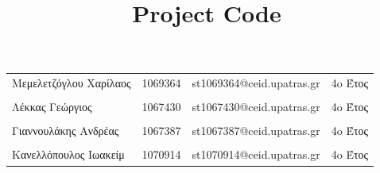 \documentclass{../ol-softwaremanual}
\begin{document}
	
	
	\begin{titlepage}
		
		
		\title{\en Project Code \\}
	\end{titlepage}
	
	
	\maketitle
	
	\newpage
	
	
	\vspace{20pt}
	
	
	
	\begin{table}[htbp!]
		
		\begin{tabular}{llll}
			Μεμελετζόγλου Χαρίλαος & 1069364 & \en st1069364@ceid.upatras.gr & 4o Έτος   \\ 
			\\ Λέκκας Γεώργιος      &      1067430    &   \en st1067430@ceid.upatras.gr & 4o Έτος  \\
			\\ Γιαννουλάκης Ανδρέας        &   1067387       & \en st1067387@ceid.upatras.gr & 4o Έτος           \\
			\\ Κανελλόπουλος Ιωακείμ        &  1070914        &    \en st1070914@ceid.upatras.gr & 4o Έτος        \\ 
		\end{tabular}
	\end{table}
	
\end{document}
